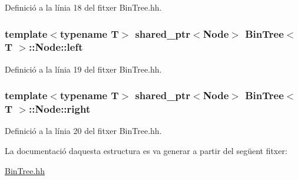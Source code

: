Definició a la línia 18 del fitxer Bin\+Tree.\+hh.

\subsubsection[{\texorpdfstring{left}{left}}]{\setlength{\rightskip}{0pt plus 5cm}template$<$typename T$>$ shared\+\_\+ptr$<${\bf Node}$>$ {\bf Bin\+Tree}$<$ T $>$\+::Node\+::left}\hypertarget{struct_bin_tree_1_1_node_a265a6367635a38838e6a6366564be78d}{}\label{struct_bin_tree_1_1_node_a265a6367635a38838e6a6366564be78d}


Definició a la línia 19 del fitxer Bin\+Tree.\+hh.

\subsubsection[{\texorpdfstring{right}{right}}]{\setlength{\rightskip}{0pt plus 5cm}template$<$typename T$>$ shared\+\_\+ptr$<${\bf Node}$>$ {\bf Bin\+Tree}$<$ T $>$\+::Node\+::right}\hypertarget{struct_bin_tree_1_1_node_a6df770137090da60cd0376ce06893cbd}{}\label{struct_bin_tree_1_1_node_a6df770137090da60cd0376ce06893cbd}


Definició a la línia 20 del fitxer Bin\+Tree.\+hh.



La documentació d\textquotesingle{}aquesta estructura es va generar a partir del següent fitxer\+:\begin{DoxyCompactItemize}
\item 
\hyperlink{_bin_tree_8hh}{Bin\+Tree.\+hh}\end{DoxyCompactItemize}

